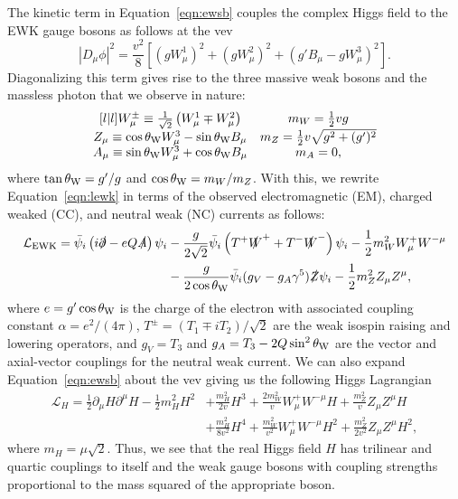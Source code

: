 The kinetic term in Equation~\ref{eqn:ewsb} couples the complex Higgs field to the EWK gauge bosons as follows at the vev
\begin{equation}
  \left| D_\mu \phi \right|^2 = \frac{v^2}{8} \left[ \left(g W_\mu^1 \right)^2 + \left(g W_\mu^2 \right)^2 + \left(g' B_\mu - g W_\mu^3 \right)^2 \right].
\end{equation}
Diagonalizing this term gives rise to the three massive weak bosons and the massless photon that we observe in nature:
\begin{equation}
  \begin{matrix}[l | l]
    W_\mu^{\pm} \equiv \frac{1}{\sqrt{2}} \left( W_\mu^1 \mp W_\mu^2 \right)
    & m_W = \frac{1}{2} vg \\
    Z_\mu \equiv \cos \theta_{\text{W}} W_\mu^3 - \sin \theta_{\text{W}} B_\mu
    & m_Z = \frac{1}{2} v \sqrt{g^2 + (g')^2} \\
    A_\mu \equiv \sin \theta_{\text{W}} W_\mu^3 + \cos \theta_{\text{W}} B_\mu
    & m_A = 0,
  \end{matrix}
\end{equation}
where $\tan \theta_{\text{W}} = g'/g$ and $\cos \theta_{\text{W}} = m_W / m_Z$.
With this, we rewrite Equation~\ref{eqn:lewk} in terms of the observed electromagnetic (EM), charged weaked (CC), and neutral weak (NC) currents as follows:
\begin{align}
  \label{eqn:lewsb}
  \mathcal{L}_{\text{EWK}} %
  = \bar \psi_i \left( i \slashed \partial - e Q \slashed A \right) \psi_i
  & - \frac{g}{2\sqrt{2}} \bar \psi_i \left( T^+ \slashed W^+ + T^- \slashed W^- \right) \psi_i - \frac{1}{2} m_W^2 W_\mu^+ W^{-\mu} \nonumber \\
   & - \frac{g}{2 \cos \thetaw} \bar \psi_i (g_V - g_A \gamma^5) \slashed Z \psi_i - \frac{1}{2} m_Z^2 Z_\mu Z^\mu, 
\end{align}
where $e = g' \cos \theta_{\text{W}}$ is the charge of the electron with associated coupling constant $\alpha = e^2/(4\pi)$, $T^\pm = (T_1 \mp i T_2)/\sqrt{2}$ are the weak isospin raising and lowering operators, and $g_V = T_3$ and $g_A = T_3 - 2 Q \sin^2 \theta_{\text{W}}$ are the vector and axial-vector couplings for the neutral weak current.
We can also expand Equation~\ref{eqn:ewsb} about the vev giving us the following Higgs Lagrangian
\begin{align}
  \mathcal{L}_H = \frac{1}{2} \partial_\mu H \partial^\mu H - \frac{1}{2} m_H^2 H^2
  & + \frac{m_H^2}{2 v} H^3 + \frac{2 m_W^2}{v} W_\mu^+ W^{-\mu} H + \frac{m_Z^2}{v} Z_\mu Z^\mu H \nonumber \\
  & + \frac{m_H^2}{8 v^2} H^4 + \frac{m_W^2}{v^2} W_\mu^+ W^{-\mu} H^2 + \frac{m_Z^2}{2v^2} Z_\mu Z^\mu H^2, 
\end{align}
where $m_H = \mu \sqrt{2} $.
Thus, we see that the real Higgs field $H$ has trilinear and quartic couplings to itself and the weak gauge bosons with coupling strengths proportional to the mass squared of the appropriate boson.


